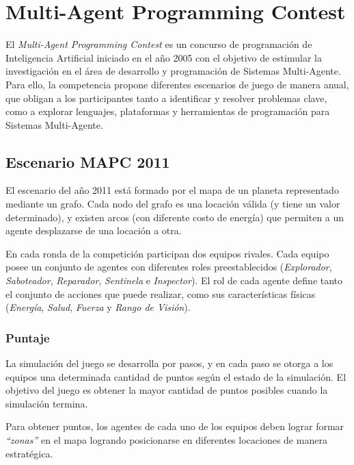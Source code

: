 \section{Multi-Agent Programming Contest}
\label{sec:mapc}


El \textit{Multi-Agent Programming Contest} es un concurso de
programación de Inteligencia Artificial iniciado en el año 2005 con el
objetivo de estimular la investigación en el área de desarrollo y
programación de Sistemas Multi-Agente.
Para ello, la competencia propone diferentes escenarios de juego de
manera anual, que obligan a los participantes tanto a identificar y
resolver problemas clave, como a explorar lenguajes, plataformas y
herramientas de programación para Sistemas Multi-Agente.


\subsection{Escenario MAPC 2011}
\label{sec:escenario_mapc}


El escenario del año 2011 está formado por el mapa de un planeta
representado mediante un grafo.
Cada nodo del grafo es una locación válida (y tiene un valor
determinado), y existen arcos (con diferente costo de energía) que
permiten a un agente desplazarse de una locación a otra.


En cada ronda de la competición participan dos equipos rivales.
Cada equipo posee un conjunto de agentes con diferentes roles
preestablecidos (\textit{Explorador}, \textit{Saboteador},
\textit{Reparador}, \textit{Sentinela} e \textit{Inspector}).
El rol de cada agente define tanto el conjunto de acciones que puede
realizar, como sus características físicas (\textit{Energía},
\textit{Salud}, \textit{Fuerza} y \textit{Rango de Visión}).


\subsubsection{Puntaje}
\label{sec:puntaje}


La simulación del juego se desarrolla por pasos, y en cada paso se
otorga a los equipos una determinada cantidad de puntos según el
estado de la simulación.
El objetivo del juego es obtener la mayor cantidad de puntos posibles
cuando la simulación termina.


Para obtener puntos, los agentes de cada uno de los equipos deben
lograr formar \textit{"`zonas"'} en el mapa logrando posicionarse en
diferentes locaciones de manera estratégica. 

